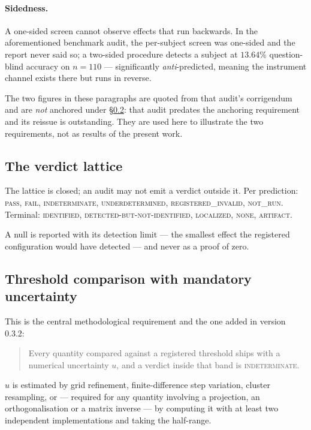 \documentclass[11pt,a4paper]{article}
\newcommand{\verdict}[1]{\textsc{#1}}
\begin{document}
\paragraph{Sidedness.} A one-sided screen cannot observe effects that run
backwards. In the aforementioned benchmark audit, the per-subject screen was one-sided 
and the report never said so; a two-sided procedure detects a subject at $13.64\%$
question-blind accuracy on $n=110$ --- significantly \emph{anti}-predicted,
meaning the instrument channel exists there but runs in reverse.

The two figures in these paragraphs are quoted from that audit's corrigendum
and are \emph{not} anchored under \S\ref{sec:threshold}: that audit predates the
anchoring requirement and its reissue is outstanding. They are used here to
illustrate the two requirements, not as results of the present work.

\subsection{The verdict lattice}

The lattice is closed; an audit may not emit a verdict outside it. Per
prediction: \verdict{pass}, \verdict{fail}, \verdict{indeterminate},
\verdict{underdetermined}, \verdict{registered\_invalid}, \verdict{not\_run}.
Terminal: \verdict{identified}, \verdict{detected-but-not-identified},
\verdict{localized}, \verdict{none}, \verdict{artifact}.

A null is reported with its detection limit --- the smallest effect the
registered configuration would have detected --- and never as a proof of zero.

\subsection{Threshold comparison with mandatory uncertainty}
\label{sec:threshold}

This is the central methodological requirement and the one added in version
0.3.2:

\begin{quote}
Every quantity compared against a registered threshold ships with a numerical
uncertainty $u$, and a verdict inside that band is \verdict{indeterminate}.
\end{quote}

$u$ is estimated by grid refinement, finite-difference step variation, cluster
resampling, or --- required for any quantity involving a projection, an
orthogonalisation or a matrix inverse --- by computing it with at least two
independent implementations and taking the half-range.
\end{document}
